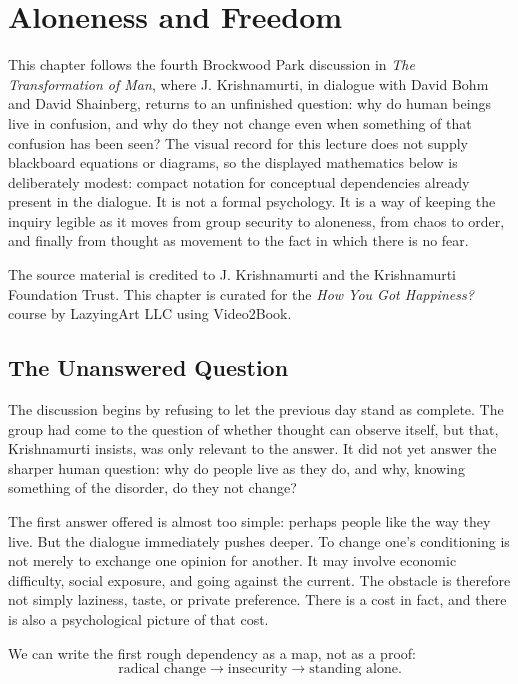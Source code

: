 \chapter{Aloneness and Freedom}

This chapter follows the fourth Brockwood Park discussion in \emph{The Transformation of Man}, where J. Krishnamurti, in dialogue with David Bohm and David Shainberg, returns to an unfinished question: why do human beings live in confusion, and why do they not change even when something of that confusion has been seen? The visual record for this lecture does not supply blackboard equations or diagrams, so the displayed mathematics below is deliberately modest: compact notation for conceptual dependencies already present in the dialogue. It is not a formal psychology. It is a way of keeping the inquiry legible as it moves from group security to aloneness, from chaos to order, and finally from thought as movement to the fact in which there is no fear.

The source material is credited to J. Krishnamurti and the Krishnamurti Foundation Trust. This chapter is curated for the \emph{How You Got Happiness?} course by LazyingArt LLC using Video2Book.

\section{The Unanswered Question}

The discussion begins by refusing to let the previous day stand as complete. The group had come to the question of whether thought can observe itself, but that, Krishnamurti insists, was only relevant to the answer. It did not yet answer the sharper human question: why do people live as they do, and why, knowing something of the disorder, do they not change?

The first answer offered is almost too simple: perhaps people like the way they live. But the dialogue immediately pushes deeper. To change one's conditioning is not merely to exchange one opinion for another. It may involve economic difficulty, social exposure, and going against the current. The obstacle is therefore not simply laziness, taste, or private preference. There is a cost in fact, and there is also a psychological picture of that cost.

We can write the first rough dependency as a map, not as a proof:
\begin{equation}
\text{radical change}
\longrightarrow
\text{insecurity}
\longrightarrow
\text{standing alone}.
\end{equation}

